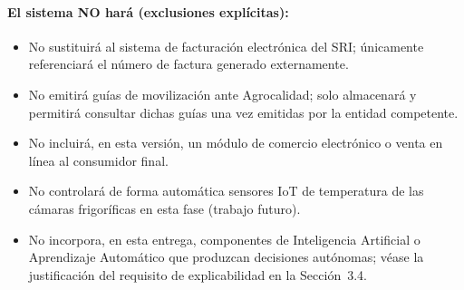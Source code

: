 \documentclass[11pt,a4paper]{article}
\begin{document}
\paragraph{El sistema NO hará (exclusiones explícitas):}
\begin{itemize}[nosep]
\item No sustituirá al sistema de facturación electrónica del SRI; únicamente referenciará el número de factura generado externamente.
\item No emitirá guías de movilización ante Agrocalidad; solo almacenará y permitirá consultar dichas guías una vez emitidas por la entidad competente.
\item No incluirá, en esta versión, un módulo de comercio electrónico o venta en línea al consumidor final.
\item No controlará de forma automática sensores IoT de temperatura de las cámaras frigoríficas en esta fase (trabajo futuro).
\item No incorpora, en esta entrega, componentes de Inteligencia Artificial o Aprendizaje Automático que produzcan decisiones autónomas; véase la justificación del requisito de explicabilidad en la Sección~3.4.
\end{itemize}
\end{document}
